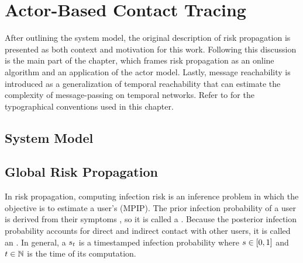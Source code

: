 \chapter{Actor-Based Contact Tracing}

After outlining the system model, the original description of risk propagation is presented as both context and motivation for this work. Following this discussion is the main part of the chapter, which frames risk propagation as an online algorithm and an application of the actor model. Lastly, message reachability is introduced as a generalization of temporal reachability that can estimate the complexity of message-passing on temporal networks. Refer to  for the typographical conventions used in this chapter.

\section{System Model}

\section{Global Risk Propagation}

In risk propagation, computing infection risk is an inference problem in which the objective is to estimate a user's  (MPIP). The prior infection probability of a user is derived from their symptoms \cite{Menni2020}, so it is called a . Because the posterior infection probability accounts for direct and indirect contact with other users\footnotemark{}, it is called an . In general, a  $s_t$ is a timestamped infection probability where $s \in [0, 1]$ and $t \in \mathbb{N}$ is the time of its computation.


\newcommand{\eventspace}{\Omega}
\newcommand{\event}{\omega}

